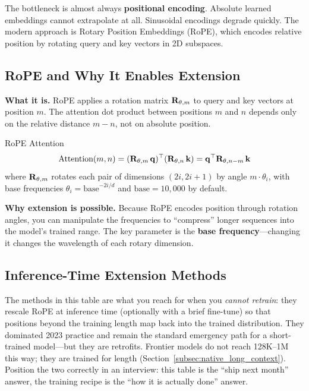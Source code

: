 The bottleneck is almost always \textbf{positional encoding}. Absolute learned embeddings cannot extrapolate at all. Sinusoidal encodings degrade quickly. The modern approach is Rotary Position Embeddings (RoPE), which encodes relative position by rotating query and key vectors in 2D subspaces.

\subsection{RoPE and Why It Enables Extension}

\textbf{What it is.} RoPE applies a rotation matrix $\mathbf{R}_{\theta, m}$ to query and key vectors at position $m$. The attention dot product between positions $m$ and $n$ depends only on the relative distance $m - n$, not on absolute position.

\begin{mathresult}{RoPE Attention}
\[
\text{Attention}(m, n) = (\mathbf{R}_{\theta, m}\,\mathbf{q})^\top (\mathbf{R}_{\theta, n}\,\mathbf{k}) = \mathbf{q}^\top \mathbf{R}_{\theta, n-m}\,\mathbf{k}
\]
where $\mathbf{R}_{\theta, m}$ rotates each pair of dimensions $(2i, 2i{+}1)$ by angle $m \cdot \theta_i$, with base frequencies $\theta_i = \text{base}^{-2i/d}$ and $\text{base} = 10{,}000$ by default.
\end{mathresult}

\textbf{Why extension is possible.} Because RoPE encodes position through rotation angles, you can manipulate the frequencies to ``compress'' longer sequences into the model's trained range. The key parameter is the \textbf{base frequency}---changing it changes the wavelength of each rotary dimension.

\subsection{Inference-Time Extension Methods}
\label{subsec:inference_time_extension}

The methods in this table are what you reach for when you \textit{cannot retrain}: they rescale RoPE at inference time (optionally with a brief fine-tune) so that positions beyond the training length map back into the trained distribution. They dominated 2023 practice and remain the standard emergency path for a short-trained model---but they are retrofits. Frontier models do not reach 128K--1M this way; they are trained for length (Section~\ref{subsec:native_long_context}). Position the two correctly in an interview: this table is the ``ship next month'' answer, the training recipe is the ``how it is actually done'' answer.

